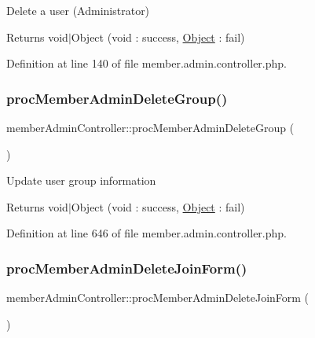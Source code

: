 Delete a user (Administrator) \begin{DoxyReturn}{Returns}
void$\vert$\+Object (void \+: success, \hyperlink{classObject}{Object} \+: fail) 
\end{DoxyReturn}


Definition at line 140 of file member.\+admin.\+controller.\+php.

\mbox{\label{classmemberAdminController_a8ee81f4eedf5dc094b5a21a9a1200849}} 
\subsubsection{\texorpdfstring{proc\+Member\+Admin\+Delete\+Group()}{procMemberAdminDeleteGroup()}}
{\footnotesize\ttfamily member\+Admin\+Controller\+::proc\+Member\+Admin\+Delete\+Group (\begin{DoxyParamCaption}{ }\end{DoxyParamCaption})}

Update user group information \begin{DoxyReturn}{Returns}
void$\vert$\+Object (void \+: success, \hyperlink{classObject}{Object} \+: fail) 
\end{DoxyReturn}


Definition at line 646 of file member.\+admin.\+controller.\+php.

\mbox{\label{classmemberAdminController_a0f31e7762e615b195d826f24d87a4f68}} 
\subsubsection{\texorpdfstring{proc\+Member\+Admin\+Delete\+Join\+Form()}{procMemberAdminDeleteJoinForm()}}
{\footnotesize\ttfamily member\+Admin\+Controller\+::proc\+Member\+Admin\+Delete\+Join\+Form (\begin{DoxyParamCaption}{ }\end{DoxyParamCaption})}


